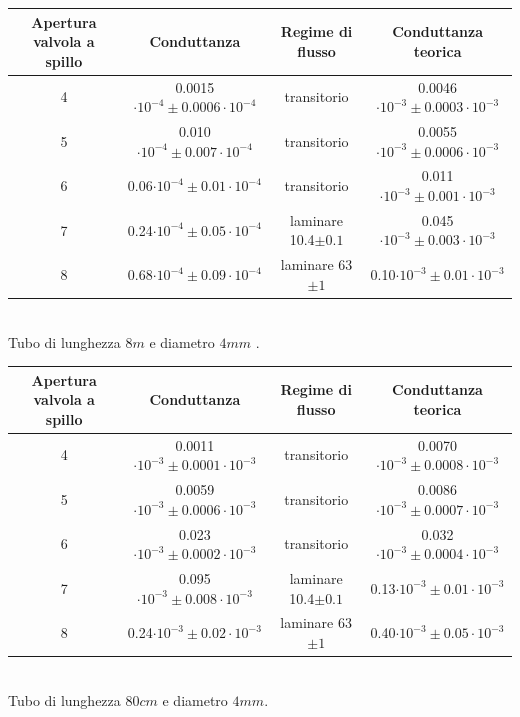\documentclass[a4paper,11pt]{article}
\begin{document}
\begin{center} 
\begin{tabular}{|c|c|c|c|}
\hline Apertura valvola a spillo & Conduttanza & Regime di flusso & Conduttanza teorica \\ 
\hline 4 & 0.0015 $\cdot10^{-4}\pm 0.0006\cdot10^{-4}$ & transitorio & 0.0046$\cdot10^{-3}\pm 0.0003\cdot10^{-3}$ \\ 
\hline 5 & 0.010$\cdot10^{-4}\pm 0.007\cdot10^{-4}$ & transitorio & 0.0055$\cdot10^{-3}\pm 0.0006\cdot10^{-3}$ \\ 
\hline 6 & 0.06$\cdot10^{-4}\pm 0.01\cdot10^{-4}$ & transitorio & 0.011$\cdot10^{-3}\pm 0.001\cdot10^{-3}$ \\
\hline 7 & 0.24$\cdot10^{-4}\pm 0.05\cdot10^{-4}$ & laminare 10.4$\pm0.1$ & 0.045$\cdot10^{-3}\pm 0.003\cdot10^{-3}$ \\
\hline 8 & 0.68$\cdot10^{-4}\pm 0.09\cdot10^{-4}$ & laminare 63$\pm1$ & 0.10$\cdot10^{-3}\pm 0.01\cdot10^{-3}$ \\ 
\hline 
\end{tabular}\\
\vspace{5pt}
Tubo di lunghezza $8m$ e diametro $4mm$ .
\\
\vspace{15pt}
\begin{tabular}{|c|c|c|c|}
\hline Apertura valvola a spillo & Conduttanza & Regime di flusso & Conduttanza teorica \\ 
\hline 4 & 0.0011$\cdot10^{-3}\pm 0.0001\cdot10^{-3}$ & transitorio & 0.0070$\cdot10^{-3}\pm 0.0008\cdot10^{-3}$ \\ 
\hline 5 & 0.0059$\cdot10^{-3}\pm 0.0006\cdot10^{-3}$ & transitorio & 0.0086$\cdot10^{-3}\pm 0.0007\cdot10^{-3}$ \\ 
\hline 6 & 0.023$\cdot10^{-3}\pm 0.0002\cdot10^{-3}$ & transitorio & 0.032$\cdot10^{-3}\pm 0.0004\cdot10^{-3}$ \\
\hline 7 & 0.095$\cdot10^{-3}\pm 0.008\cdot10^{-3}$ & laminare 10.4$\pm0.1$ & 0.13$\cdot10^{-3}\pm 0.01\cdot10^{-3}$ \\
\hline 8 & 0.24$\cdot10^{-3}\pm 0.02\cdot10^{-3}$ & laminare 63$\pm1$ & 0.40$\cdot10^{-3}\pm 0.05\cdot10^{-3}$ \\ 
\hline 
\end{tabular}\\
\vspace{5pt}
Tubo di lunghezza $80cm$ e diametro $4mm$.
\\
\vspace{15pt}

\end{center}
\end{document}

